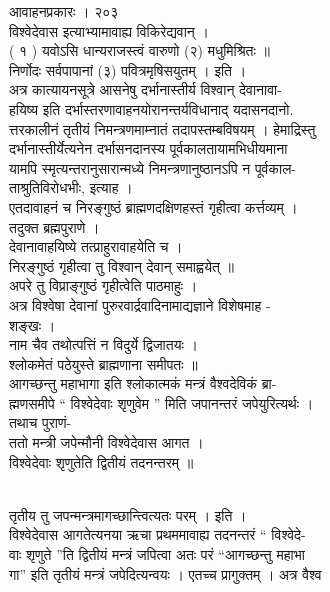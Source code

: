 \documentclass[11pt, openany]{book}
\begin{document}
{{{{{{{{{{ }{ आवाहनप्रकारः । २०३}{\\
विश्वेदेवास इत्याभ्यामावाह्य विकिरेद्यवान् ।\\
( १ ) यवोऽसि धान्यराजस्त्वं वारुणो (२) मधुमिश्रितः ॥\\
निर्णोदः सर्वपापानां (३) पवित्रमृषिसयुतम् । इति ।\\
अत्र कात्यायनसूत्रे आसनेषु दर्भानास्तीर्य विश्वान् देवानावा-\\
हयिष्य इति दर्भास्तरणावाहनयोरानन्तर्यविधानाद् यदासनदानो.\\
त्तरकालीनं तृतीयं निमन्त्रणमाम्नातं तदापस्तम्बविषयम् । हेमाद्रिस्तु\\
दर्भानास्तीर्येत्यनेन दर्भासनदानस्य पूर्वकालतायामभिधीयमाना\\
यामपि स्मृत्यन्तरानुसारान्मध्ये निमन्त्रणानुष्ठानऽपि न पूर्वकाल-\\
ताश्रुतिविरोधभीः, इत्याह ।\\
एतदावाहनं च निरङ्गुष्ठं ब्राह्मणदक्षिणहस्तं गृहीत्वा कर्त्तव्यम् ।\\
तदुक्त ब्रह्मपुराणे ।\\
देवानावाहयिष्ये तत्प्राहुरावाहयेति च ।\\
निरङ्गुष्ठं गृहीत्वा तु विश्वान् देवान् समाह्वयेत् ॥\\
अपरे तु विप्राङ्गुष्ठं गृहीत्वेति पाठमाहुः ।\\
अत्र विश्वेषा देवानां पुरुरवार्द्रवादिनामाद्यज्ञाने विशेषमाह -\\
शङ्खः ।\\
नाम चैव तथोत्पत्तिं न विदुर्ये द्विजातयः ।\\
श्लोकमेतं पठेयुस्ते ब्राह्मणाना समीपतः ॥\\
आगच्छन्तु महाभागा इति श्लोकात्मकं मन्त्रं वैश्वदेविकं ब्रा-\\
ह्मणसमीपे `` विश्वेदेवाः शृणुवेम '' मिति जपानन्तरं जपेयुरित्यर्थः ।\\
तथाच पुराणं-\\
ततो मन्त्री जपेन्मौनी विश्वेदेवास आगत ।\\
विश्वेदेवाः शृणुतेति द्वितीयं तदनन्तरम् }{॥}{\\
तृतीय तु जपन्मन्त्रमागच्छान्त्वित्यतः परम् । इति ।\\
विश्वेदेवास आगतेत्यनया ऋचा प्रथममावाह्य तदनन्तरं `` विश्वेदे-\\
वाः शृणुते ''ति द्वितीयं मन्त्रं जपित्वा अतः परं ``आगच्छन्तु महाभा\\
गा'' इति तृतीयं मन्त्रं जपेदित्यन्वयः । एतच्च प्रागुक्तम् । अत्र वैश्व


}}}}}}}}}}
\end{document}
